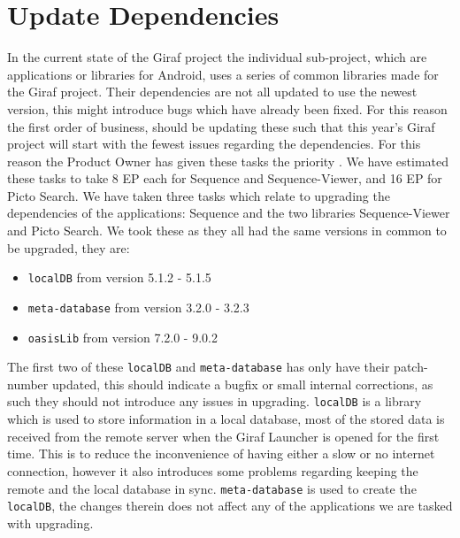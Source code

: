 \section{Update Dependencies} 
In the current state of the Giraf project the individual sub-project, which are applications or libraries for Android, uses a series of common libraries made for the Giraf project. 
Their dependencies are not all updated to use the newest version, this might introduce bugs which have already been fixed. 
For this reason the first order of business, should be updating these such that this year's Giraf project will start with the fewest issues regarding the dependencies. 
For this reason the Product Owner has given these tasks the priority \phigh. 
We have estimated these tasks to take 8 EP each for Sequence and Sequence-Viewer, and 16 EP for Picto Search. 
We have taken three tasks which relate to upgrading the dependencies of the applications: Sequence and the two libraries Sequence-Viewer and Picto Search. 
We took these as they all had the same versions in common to be upgraded, they are: 
\begin{itemize} 
    \item \texttt{localDB} from version 5.1.2 - 5.1.5 
    \item \texttt{meta-database} from version 3.2.0 - 3.2.3 
    \item \texttt{oasisLib} from version 7.2.0 - 9.0.2 
\end{itemize} 
The first two of these \texttt{localDB} and \texttt{meta-database} has only have their patch-number updated, this should indicate a bugfix or small internal corrections, as such they should not introduce any issues in upgrading. 
\texttt{localDB} is a library which is used to store information in a local database, most of the stored data is received from the remote server when the Giraf Launcher is opened for the first time. 
This is to reduce the inconvenience of having either a slow or no internet connection, however it also introduces some problems regarding keeping the remote and the local database in sync.  
\texttt{meta-database} is used to create the \texttt{localDB}, the changes therein does not affect any of the applications we are tasked with upgrading. 
  
